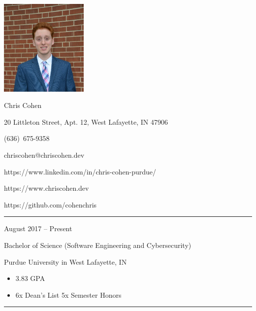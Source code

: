 \documentclass[a4paper]{article}
\newlength{\cvcolumngapwidth}
\newlength{\cvleftcolumnwidth}
\newlength{\cvrightcolumnwidth}
\newcommand{\cvnamestyle}[1]{{\Huge\cvnamefont\textcolor{cvnamecolor}{#1}}}
\newcommand{\cvsectionstyle}[1]{{\normalsize\cvsectionfont\textcolor{cvsectioncolor}{#1}}}
\newcommand{\cvtitlestyle}[1]{{\large\cvtitlefont\textcolor{cvtitlecolor}{#1}}}
\newcommand{\cvdurationstyle}[1]{{\small\cvdurationfont\textcolor{cvdurationcolor}{#1}}}
\newlength{\cvafteritemskipamount}
\newlength{\cvaftersectionskipamount}
\newlength{\cvafternameskipamount}
\newlength{\cvafterpersonalinfolineskipamount}
\newlength{\cvaftertitleskipamount}
\newlength{\cvparskip}
\newcommand{\cvpersonalinfo}[2]{
    \begin{minipage}[t]{\cvleftcolumnwidth}
        \vspace{0mm} %
        \raggedleft #1
    \end{minipage}%
    \hspace{\cvcolumngapwidth}%
    \begin{minipage}[t]{\cvrightcolumnwidth}
        \vspace{0mm} %
        #2
    \end{minipage}

    \vspace{\cvafteritemskipamount}
}
\newcommand{\cvname}[1]{
    \cvnamestyle{#1}

    \vspace{\cvafternameskipamount}
}
\newcommand{\cvpersonalinfolinewithicon}[3]{
    \raisebox{.5\fontcharht\font`E-.5\height}{\texttt{[image: \#2]}}
    #3

    \vspace{\cvafterpersonalinfolineskipamount}
}
\newcommand{\cvsection}[1]{
    \begin{minipage}[t]{\cvleftcolumnwidth}
        \raggedleft\cvsectionstyle{#1}
    \end{minipage}%
    \hspace{\cvcolumngapwidth}%
    \begin{minipage}[t]{\cvrightcolumnwidth}
        \textcolor{cvrulecolor}{\rule{\cvrightcolumnwidth}{0.3mm}}
    \end{minipage}

    \vspace{\cvaftersectionskipamount}
}
\newcommand{\cvitem}[2]{
    \begin{minipage}[t]{\cvleftcolumnwidth}
        \raggedleft #1
    \end{minipage}%
    \hspace{\cvcolumngapwidth}%
    \begin{minipage}[t]{\cvrightcolumnwidth}
        \setlength{\parskip}{\cvparskip} #2
    \end{minipage}

    \vspace{\cvafteritemskipamount}
}
\newcommand{\cvtitle}[1]{
    \cvtitlestyle{#1}

    \vspace{\cvaftertitleskipamount}
    \vspace{-\cvparskip}
}
\begin{document}

\cvpersonalinfo{
    \includegraphics[height=47mm]{img/me.png}
}{
    \cvname{Chris Cohen}

    \cvpersonalinfolinewithicon{height=4mm}{img/location.png}{
        20 Littleton Street, Apt. 12, West Lafayette, IN 47906
    }

    \cvpersonalinfolinewithicon{height=4mm, width=4mm}{img/phone.png}{
      (636)\ 675-9358
    }

    \cvpersonalinfolinewithicon{height=4mm}{img/email.png}{
      chriscohen@chriscohen.dev
    }

    \cvpersonalinfolinewithicon{height=4mm}{img/linkedin.png}{
      https://www.linkedin.com/in/chris-cohen-purdue/
    }

    \cvpersonalinfolinewithicon{height=4mm}{img/website.png}{
      https://www.chriscohen.dev
    }

    \cvpersonalinfolinewithicon{height=4mm}{img/github.png}{
      https://github.com/cohenchris
    }
}


\cvsection{EDUCATION}

\cvitem{
    \cvdurationstyle{August 2017 -- Present}
}{
    \cvtitle{Bachelor of Science (Software Engineering and Cybersecurity)}

    \large
    Purdue University in West Lafayette, IN

    \normalsize
    \begin{itemize}[leftmargin=*]
        \item 3.83 GPA
        \item 6x Dean's List \hspace{10mm} 5x Semester Honors
    \end{itemize}
}


\cvsection{WORK EXPERIENCE}
\end{document}
